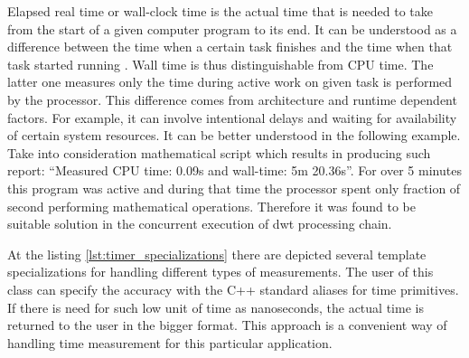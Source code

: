 Elapsed real time or wall-clock time is the actual time that is needed to take from the start of a given
computer program to its end. It can be understood as a difference between the time when a certain task 
finishes and the time when that task started running \cite{wall_clock}. Wall time is thus distinguishable
from CPU time. The latter one measures only the time during active work on given task is performed by the
processor. This difference comes from architecture and runtime dependent factors. For example, it can involve
intentional delays and waiting for availability of certain system resources. It can be better understood
in the following example. Take into consideration mathematical script which results in producing such report:
``Measured CPU time: 0.09s and wall-time: 5m 20.36s''. For over 5 minutes this program was active and during
that time the processor spent only fraction of second performing mathematical operations. Therefore it was
found to be suitable solution in the concurrent execution of dwt processing chain.

At the listing \ref{lst:timer_specializations} there are depicted several template specializations for
handling different types of measurements. The user of this class can specify the accuracy with the C++ standard
aliases for time primitives. If there is need for such low unit of time as nanoseconds, the actual time
is returned to the user in the bigger format. This approach is a convenient way of handling time measurement
for this particular application.

